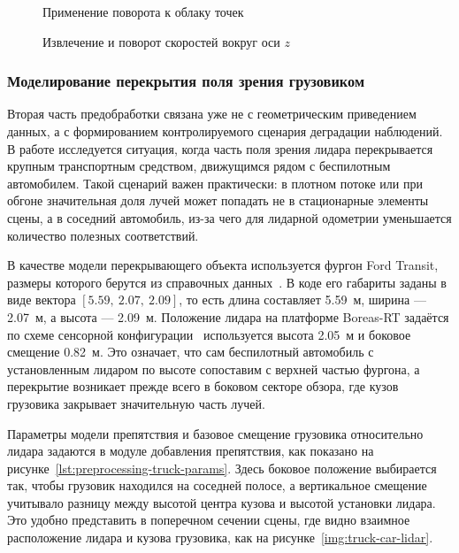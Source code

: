 \begin{figure}
  \fontsize{12pt}{14pt}\selectfont
  
  \caption{Применение поворота к облаку точек}
  \label{lst:preprocessing-rotate-points}
\end{figure}

\begin{figure}
  \fontsize{12pt}{14pt}\selectfont
  
  \caption{Извлечение и поворот скоростей вокруг оси \(z\)}
  \label{lst:preprocessing-velocities-extraction}
\end{figure}

\subsubsection{Моделирование перекрытия поля зрения грузовиком}

Вторая часть предобработки связана уже не с геометрическим приведением данных, а с формированием контролируемого сценария деградации наблюдений. В работе исследуется ситуация, когда часть поля зрения лидара перекрывается крупным транспортным средством, движущимся рядом с беспилотным автомобилем. Такой сценарий важен практически: в плотном потоке или при обгоне значительная доля лучей может попадать не в стационарные элементы сцены, а в соседний автомобиль, из-за чего для лидарной одометрии уменьшается количество полезных соответствий.

В качестве модели перекрывающего объекта используется фургон Ford Transit, размеры которого берутся из справочных данных~\cite{ford-transit-dimensions}. В коде его габариты заданы в виде вектора \([5.59,\ 2.07,\ 2.09]\), то есть длина составляет 5.59~м, ширина --- 2.07~м, а высота --- 2.09~м. Положение лидара на платформе Boreas-RT задаётся по схеме сенсорной конфигурации~\cite{boreas-rt-sensors-image} используется высота 2.05~м и боковое смещение 0.82~м. Это означает, что сам беспилотный автомобиль с установленным лидаром по высоте сопоставим с верхней частью фургона, а перекрытие возникает прежде всего в боковом секторе обзора, где кузов грузовика закрывает значительную часть лучей.

Параметры модели препятствия и базовое смещение грузовика относительно лидара задаются в модуле добавления препятствия, как показано на рисунке~\ref{lst:preprocessing-truck-params}. Здесь боковое положение выбирается так, чтобы грузовик находился на соседней полосе, а вертикальное смещение учитывало разницу между высотой центра кузова и высотой установки лидара. Это удобно представить в поперечном сечении сцены, где видно взаимное расположение лидара и кузова грузовика, как на рисунке~\ref{img:truck-car-lidar}.

